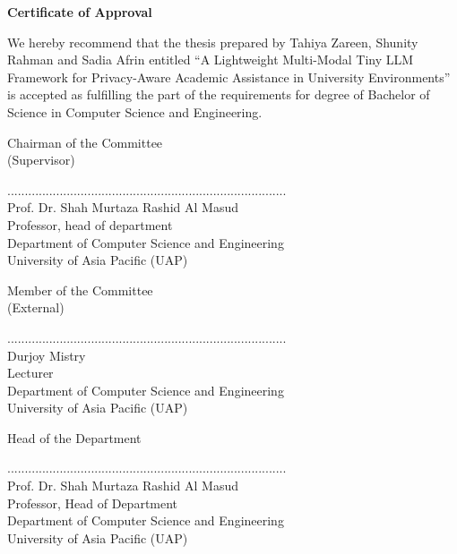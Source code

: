 \newpage
    \begin{center}
    
        \vspace*{0.1cm}
        \large
        
        
        \large
        \textbf{Certificate of Approval}\\
        \vspace{0.5cm}
        
    \end{center}
\noindent
{\large We hereby recommend that the thesis prepared by Tahiya Zareen, Shunity Rahman and Sadia Afrin entitled “A Lightweight Multi-Modal Tiny LLM Framework for
Privacy-Aware Academic Assistance in University Environments” is accepted as fulfilling the part of the requirements for degree of Bachelor of Science in Computer Science and Engineering.} 
\vspace{0.5cm}


\begin{flushright}
\vspace{1cm}
Chairman of the Committee
\\(Supervisor)
\end{flushright}
\vspace{-3cm}
................................................................................\\
Prof. Dr. Shah Murtaza Rashid Al Masud
\\Professor, head of department
\\Department of Computer Science and Engineering
\\University of Asia Pacific (UAP)

\vspace{0.5cm}
\begin{flushright}
\vspace{1cm}
Member of the Committee
\\(External)
\end{flushright}
\vspace{-3cm}
................................................................................\\
Durjoy Mistry  
\\Lecturer
\\Department of Computer Science and Engineering
\\University of Asia Pacific (UAP)

\vspace{1cm}
\begin{flushright}
Head of the Department
\end{flushright}
\vspace{-2.5cm}
................................................................................\\
Prof. Dr. Shah Murtaza Rashid Al Masud  
\\Professor, Head of Department
\\Department of Computer Science and Engineering
\\University of Asia Pacific (UAP)

